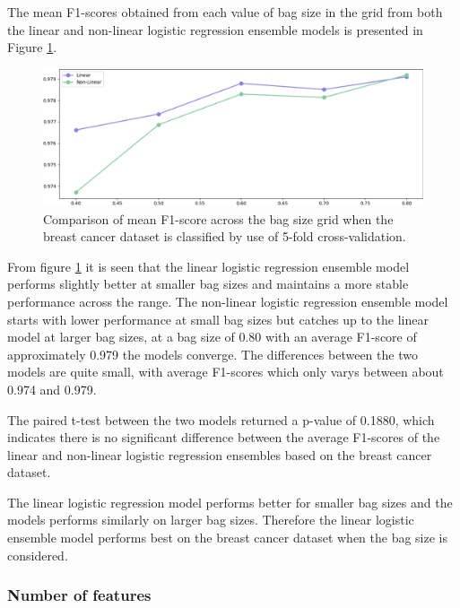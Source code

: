 \documentclass[10pt, conference]{IEEEtran}
\begin{document}
The mean F1-scores obtained from each value of bag size in the grid from both the linear and non-linear
logistic regression ensemble models is presented in Figure \ref{fig:BC_bag_comparison}.
\begin{figure}[H]
    \centerline{\includegraphics[scale=0.26]{../Images/BC_bag.PNG}}
    \caption{Comparison of mean F1-score across the bag size grid when the breast cancer dataset is classified by use of 5-fold cross-validation.}
    \label{fig:BC_bag_comparison}
\end{figure}
From figure \ref{fig:BC_bag_comparison} it is seen that the linear logistic regression ensemble model performs slightly better
at smaller bag sizes and maintains a more stable performance across the range. The non-linear logistic regression ensemble model
starts with lower performance at small bag sizes but catches up to the linear model at larger bag sizes,
at a bag size of 0.80 with an average F1-score of approximately 0.979 the models converge. The differences between
the two models are quite small, with average F1-scores which only varys between about 0.974 and 0.979.

The paired t-test between the two models returned a p-value of 0.1880, which indicates there is no significant difference
between the average F1-scores of the linear and non-linear logistic regression ensembles based on the breast cancer dataset.

The linear logistic regression model performs better for smaller bag sizes and the models performs similarly on larger
bag sizes. Therefore the linear logistic ensemble model performs best on the breast cancer dataset when the bag size is considered.

\subsubsection{Number of features}
\end{document}
